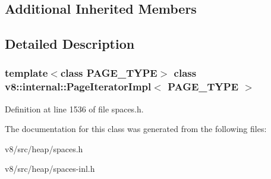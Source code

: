 \subsection*{Additional Inherited Members}


\subsection{Detailed Description}
\subsubsection*{template$<$class P\+A\+G\+E\+\_\+\+T\+Y\+PE$>$\newline
class v8\+::internal\+::\+Page\+Iterator\+Impl$<$ P\+A\+G\+E\+\_\+\+T\+Y\+P\+E $>$}



Definition at line 1536 of file spaces.\+h.



The documentation for this class was generated from the following files\+:\begin{DoxyCompactItemize}
\item 
v8/src/heap/spaces.\+h\item 
v8/src/heap/spaces-\/inl.\+h\end{DoxyCompactItemize}
